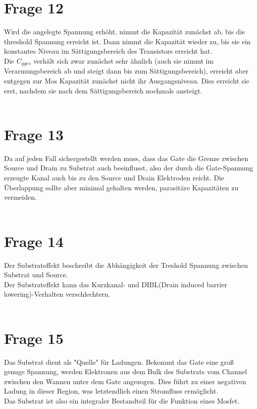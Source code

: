 \documentclass[a4paper]{scrartcl}
\begin{document}
\section*{Frage 12}
Wird die angelegte Spannung erhöht, nimmt die Kapazität zunächst ab, bis die threshold Spannung erreicht ist. Dann nimmt die Kapazität wieder zu, bis sie ein konstantes Niveau im Sättigungsbereich des Transistors erreicht hat.\\
Die $C_{gges}$ verhält sich zwar zunächst sehr ähnlich (auch sie nimmt im Verarmungsbereich ab und steigt dann bis zum Sättigungsbereich), erreicht aber entgegen zur Mos Kapazität zunächst nicht ihr Ausgangsniveau. Dies erreicht sie erst, nachdem sie nach dem Sättigungsbereich nochmals ansteigt. 
~\\
~\\
\section*{Frage 13}
Da auf jeden Fall sichergestellt werden muss, dass das Gate die Grenze zwischen Source und Drain zu Substrat auch beeinflusst, also der durch die Gate-Spannung erzeugte Kanal auch bis zu den Source und Drain Elektroden reicht. Die Überlappung sollte aber minimal gehalten werden, parasitäre Kapazitäten zu vermeiden.
~\\
~\\
\section*{Frage 14}
Der Substrateffekt beschreibt die Abhängigkeit der Treshold Spannung zwischen Substrat und Source.\\
Der Substrateffekt kann das Kurzkanal- und DIBL(Drain induced barrier lowering)-Verhalten verschlechtern.
~\\
~\\
\section*{Frage 15}
Das Substrat dient als "Quelle" für Ladungen. Bekommt das Gate eine groß genuge Spannung, werden Elektronen aus dem Bulk des Substrats vom Channel zwischen den Wannen unter dem Gate angezogen. Dies führt zu einer negativen Ladung in dieser Region, was letztendlich einen Stromfluss ermöglicht. \\
Das Substrat ist also ein integraler Bestandteil für die Funktion eines Mosfet.
~\\
~\\
\end{document}
